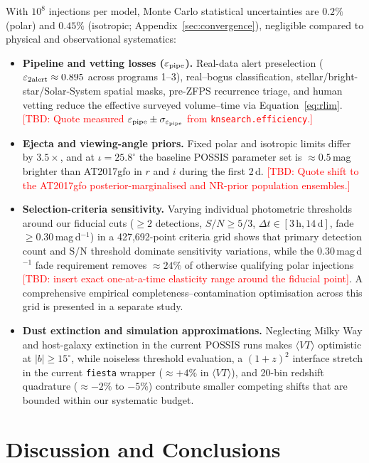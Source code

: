 \documentclass[twocolumn]{aastex631}
\newcommand{\tbd}[1]{\textcolor{red}{[TBD: #1]}}
\newcommand{\vteff}{\langle VT\rangle}
\newcommand{\epspipe}{\varepsilon_{\rm pipe}}
\begin{document}
With $10^8$ injections per model, Monte Carlo statistical uncertainties are $0.2\%$ (polar) and $0.45\%$ (isotropic; Appendix~\ref{sec:convergence}), negligible compared to physical and observational systematics:
\begin{itemize}
\item \textbf{Pipeline and vetting losses ($\epspipe$).} Real-data alert preselection ($\varepsilon_{\rm 2alert} \approx 0.895$ across programs 1--3), real--bogus classification, stellar/bright-star/Solar-System spatial masks, pre-ZFPS recurrence triage, and human vetting reduce the effective surveyed volume--time via Equation~\ref{eq:rlim}. \tbd{Quote measured $\epspipe \pm \sigma_{\epspipe}$ from \texttt{knsearch.efficiency}.}
\item \textbf{Ejecta and viewing-angle priors.} Fixed polar and isotropic limits differ by $3.5\times$, and at $\iota = 25.8^\circ$ the baseline POSSIS parameter set is $\approx 0.5$\,mag brighter than AT2017gfo in $r$ and $i$ during the first 2\,d. \tbd{Quote shift to the AT2017gfo posterior-marginalised and NR-prior population ensembles.}
\item \textbf{Selection-criteria sensitivity.} Varying individual photometric thresholds around our fiducial cuts ($\ge 2$ detections, $S/N \ge 5/3$, $\Delta t \in [3\,\mathrm{h}, 14\,\mathrm{d}]$, fade $\ge 0.30$\,mag\,d$^{-1}$) in a 427,692-point criteria grid shows that primary detection count and S/N threshold dominate sensitivity variations, while the $0.30$\,mag\,d$^{-1}$ fade requirement removes $\approx 24\%$ of otherwise qualifying polar injections \tbd{insert exact one-at-a-time elasticity range around the fiducial point}. A comprehensive empirical completeness--contamination optimisation across this grid is presented in a separate study.
\item \textbf{Dust extinction and simulation approximations.} Neglecting Milky Way and host-galaxy extinction in the current POSSIS runs makes $\vteff$ optimistic at $|b| \ge 15^\circ$, while noiseless threshold evaluation, a $(1+z)^2$ interface stretch in the current \texttt{fiesta} wrapper ($\approx +4\%$ in $\vteff$), and 20-bin redshift quadrature ($\approx -2\%$ to $-5\%$) contribute smaller competing shifts that are bounded within our systematic budget.
\end{itemize}

\section{Discussion and Conclusions}
\label{sec:conclusions}
\end{document}

